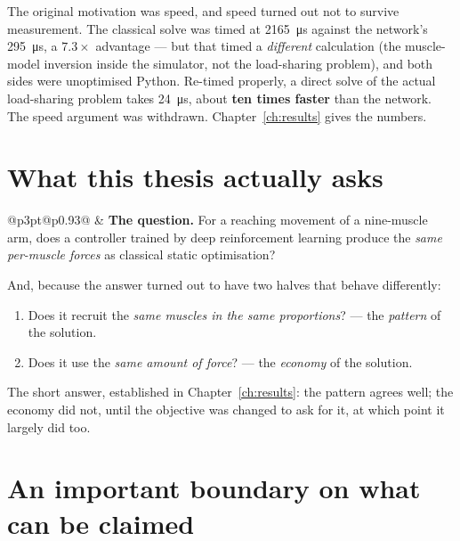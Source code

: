 \begin{trap}
The original motivation was speed, and speed turned out not to survive
measurement. The classical solve was timed at \SI{2165}{\micro\second} against
the network's \SI{295}{\micro\second}, a $7.3\times$ advantage --- but that timed
a \emph{different} calculation (the muscle-model inversion inside the simulator,
not the load-sharing problem), and both sides were unoptimised Python. Re-timed
properly, a direct solve of the actual load-sharing problem takes
\SI{24}{\micro\second}, about \textbf{ten times faster} than the network. The
speed argument was withdrawn. Chapter~\ref{ch:results} gives the numbers.
\end{trap}

\section{What this thesis actually asks}

\begin{center}
\begin{tabular}{@{}p{3pt}@{\hspace{10pt}}p{0.93\linewidth}@{}}
 & \textbf{The question.} For a reaching movement of a
nine-muscle arm, does a controller trained by deep reinforcement learning produce
the \emph{same per-muscle forces} as classical static optimisation?
\end{tabular}
\end{center}

And, because the answer turned out to have two halves that behave differently:

\begin{enumerate}[leftmargin=1.5em, itemsep=3pt]
\item Does it recruit the \emph{same muscles in the same proportions}? ---
the \emph{pattern} of the solution.
\item Does it use the \emph{same amount of force}? --- the \emph{economy} of the
solution.
\end{enumerate}

The short answer, established in Chapter~\ref{ch:results}: the pattern agrees
well; the economy did not, until the objective was changed to ask for it, at
which point it largely did too.

\section{An important boundary on what can be claimed}

